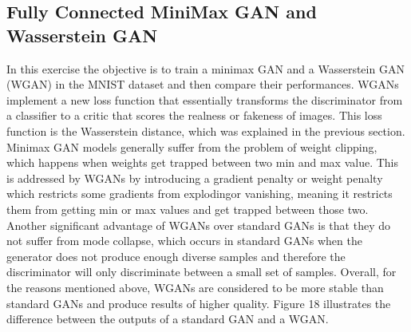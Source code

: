 \documentclass[11pt,conference,compsoc]{IEEEtran}
\begin{document}
\subsection{Fully Connected MiniMax GAN and Wasserstein GAN}
In this exercise the objective is to train a minimax GAN and a Wasserstein GAN (WGAN) in the MNIST dataset and then compare their performances. WGANs implement a new loss function that essentially transforms the discriminator from a classifier to a critic that scores the realness or fakeness of images. This loss function is the Wasserstein distance, which was explained in the previous section. Minimax GAN models generally suffer from the problem of weight clipping, which happens when weights get trapped between two min and max value. This is addressed by WGANs by introducing a gradient penalty or weight penalty which restricts some gradients from explodingor vanishing, meaning it restricts them from getting min or max values and get trapped between those two. Another significant advantage of WGANs over standard GANs is that they do not suffer from mode collapse, which occurs in standard GANs when the generator does not produce enough diverse samples and therefore the discriminator will only discriminate between a small set of samples. Overall, for the reasons mentioned above, WGANs are considered to be more stable than standard GANs and produce results of higher quality. Figure 18 illustrates the difference between the outputs of a standard GAN and a WGAN. 
\end{document}
